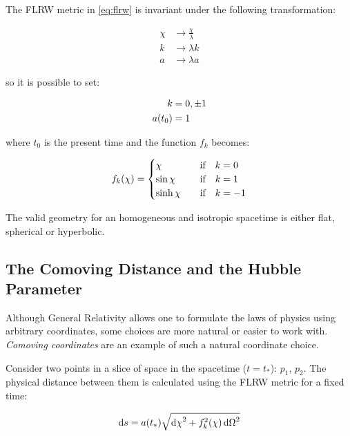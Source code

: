 The FLRW metric in \autoref{eq:flrw} is invariant under the following transformation:

\begin{equation}
        \begin{split}
                \chi & \rightarrow \frac{\chi}{\lambda} \\
                k & \rightarrow \lambda k \\
                a & \rightarrow \lambda a
        \end{split}
\end{equation}

so it is possible to set:

\begin{align}
k & = 0,\pm 1 \\
a\qty(t_0) & = 1
\end{align}

where $t_0$ is the present time and the function $f_k$ becomes:

        \begin{equation}
                f_k\qty(\chi) =
                        \begin{cases}
                                 \chi & \qif k = 0 \\
                                 \sin \chi & \qif k = 1 \\
                                 \sinh \chi & \qif k = -1
                        \end{cases}
        \end{equation}

The valid geometry for an homogeneous
and isotropic spacetime is either flat, spherical or hyperbolic.

\subsection{The Comoving Distance and the Hubble Parameter}

Although General Relativity allows one to formulate the laws of physics
using arbitrary coordinates, some choices are more natural or
easier to work with. \emph{Comoving coordinates} are an example of such a
natural coordinate choice.

Consider two points in a slice of space in the spacetime ($t = t_*$): $p_1$,
$p_2$. The physical distance between them is calculated using the FLRW
metric for a fixed time:

\begin{equation}
        \dd{s} = a\qty(t_*)\sqrt{\dd{\chi}^2 +
        f_k^2\qty(\chi)\dd{\Omega}^2}
\end{equation}


